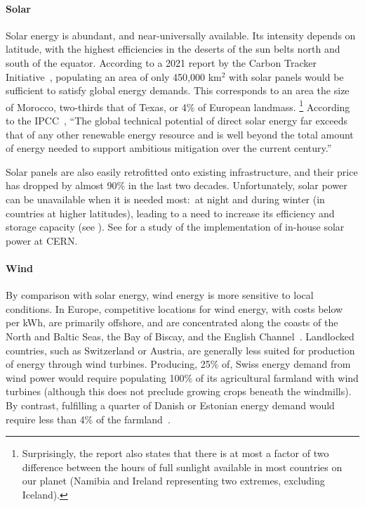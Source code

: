 \documentclass[../SustainableHEP.tex]{subfiles}
\begin{document}
\paragraph{Solar}

Solar energy is abundant, and near-universally available.  Its intensity depends on latitude, with the highest efficiencies in the deserts of the sun belts north and south of the equator. According to a 2021 report by the Carbon Tracker Initiative~\cite{CarbonTracker21}, populating an area of only 450,000 km$^2$ with solar panels would be sufficient to satisfy global energy demands.  This corresponds to an area the size of Morocco, two-thirds that of Texas, or 4\% of European landmass. \footnote{Surprisingly, the report also states that there is at most a factor of two difference between the hours of full sunlight available in most countries on our planet (Namibia and Ireland representing two extremes, excluding Iceland).}  According to the IPCC~\cite{IPCCMitigationReport}, ``The global technical potential of direct solar energy far exceeds that of any other renewable energy resource and is well beyond the total amount of energy needed to support ambitious mitigation over the current century.''

Solar panels are also easily retrofitted onto existing infrastructure, and their price has dropped by almost 90\% in the last two decades.  Unfortunately, solar power can be unavailable when it is needed most:\ at night and during winter (in countries at higher latitudes), leading to a need to increase its efficiency and storage capacity (see ). See  for a study of the implementation of in-house solar power at CERN.

\paragraph{Wind}

By comparison with solar energy, wind energy is more sensitive to local conditions. In Europe, competitive locations for wind energy, with costs below  per kWh, are primarily offshore, and are concentrated along the coasts of the North and Baltic Seas, the Bay of Biscay, and the English Channel~\cite{EEAWindEnergy}.
Landlocked countries, such as Switzerland or Austria, are generally less suited for production of energy through wind turbines. Producing, 25\% of, \eg Swiss energy demand from wind power would require populating 100\% of its agricultural farmland with wind turbines (although this does not preclude growing crops beneath the windmills).  By contrast, fulfilling a quarter of Danish or Estonian energy demand would require less than 4\% of the farmland~\cite{EEAWindEnergy}. 
\end{document}
